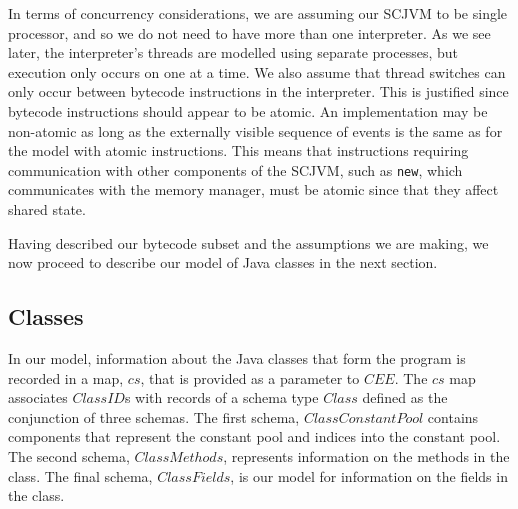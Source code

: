 In terms of concurrency considerations, we are assuming our SCJVM to
be single processor, and so we do not need to have more than one
interpreter.
As we see later, the interpreter's threads are modelled using separate
\Circus{} processes, but execution only occurs on one at a time.
We also assume that thread switches can only occur between bytecode
instructions in the interpreter.
This is justified since bytecode instructions should appear to be
atomic.
An implementation may be non-atomic as long as the externally visible
sequence of events is the same as for the model with atomic
instructions.
This means that instructions requiring communication with other
components of the SCJVM, such as \texttt{new}, which communicates with
the memory manager, must be atomic since that they affect shared
state.

Having described our bytecode subset and the assumptions we are
making, we now proceed to describe our model of Java classes in the
next section.

\subsection{Classes}
\label{cee-classes-subsection}

In our model, information about the Java classes that form the program
is recorded in a map, $cs$, that is provided as a parameter to $CEE$.
The $cs$ map associates $ClassID$s with records of a schema type
$Class$ defined as the conjunction of three schemas.
The first schema, $ClassConstantPool$ contains components that
represent the constant pool and indices into the constant pool.
The second schema, $ClassMethods$, represents information on the
methods in the class.
The final schema, $ClassFields$, is our model for information on the
fields in the class.

